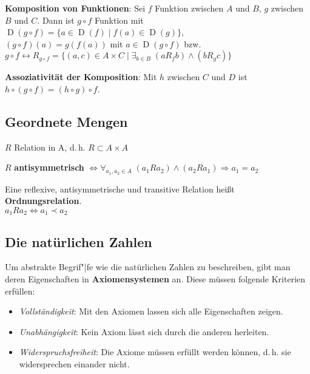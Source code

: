 \linie

\textbf{Komposition von Funktionen}: Sei $f$ Funktion zwischen $A$ und $B$, $g$
zwischen $B$ und $C$. Dann ist $g \circ f$ Funktion mit
$\operatorname{D}(g \circ f) =
\{a \in \operatorname{D}(f) \;|\; f(a) \in \operatorname{D}(g)\}$, \\
$(g \circ f)(a) = g(f(a))$ mit $a \in \operatorname{D}(g \circ f)$ bzw.
$g \circ f \leftrightarrow R_{g \circ f} = \{(a,c) \in A \times C \;|\;
\exists_{b \in B}\; (a R_f b) \land (b R_g c)\}$

\textbf{Assoziativität der Komposition}: Mit $h$ zwischen $C$ und $D$ ist
$h \circ (g \circ f) = (h \circ g) \circ f$.

\subsection{%
    Geordnete Mengen%
}

$R$ Relation in A, d.\,h. $R \subset A \times A$

$R$ \textbf{antisymmetrisch}
$\Leftrightarrow \forall_{a_1, a_2 \in A}\;
(a_1 R a_2) \land (a_2 R a_1) \Rightarrow a_1 = a_2$

Eine reflexive, antisymmetrische und transitive Relation heißt
\textbf{Ordnungsrelation}. \\
$a_1 R a_2 \Leftrightarrow a_1 \prec a_2$

\subsection{%
    Die natürlichen Zahlen%
}

Um abstrakte Begrif"|fe wie die natürlichen Zahlen zu beschreiben, gibt man
deren Eigenschaften in \textbf{Axiomensystemen} an.
Diese müssen folgende Kriterien erfüllen:
\begin{itemize}
    \item \emph{Vollständigkeit}: Mit den Axiomen lassen sich alle
    Eigenschaften zeigen.

    \item \emph{Unabhängigkeit}: Kein Axiom lässt sich durch die anderen
    herleiten.

    \item \emph{Widerspruchsfreiheit}: Die Axiome müssen erfüllt werden können,
    d.\,h. sie widersprechen einander nicht.
\end{itemize}

\linie

